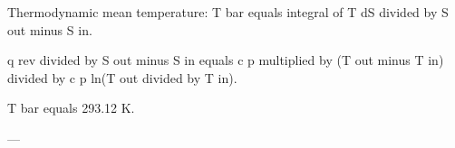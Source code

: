 Thermodynamic mean temperature:  
T bar equals integral of T dS divided by S out minus S in.  

q rev divided by S out minus S in equals c p multiplied by (T out minus T in) divided by c p ln(T out divided by T in).  

T bar equals 293.12 K.  

---
